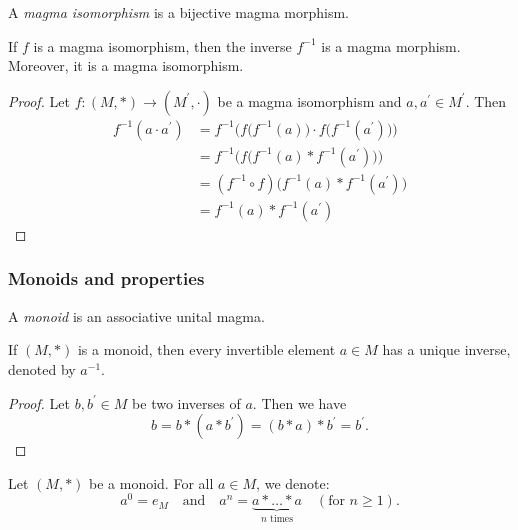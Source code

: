 \documentclass[12pt]{report}
\begin{document}
\begin{definition} \label{def-magma-isomorphism}
    A \emph{magma isomorphism} is a bijective magma morphism.
\end{definition}

\begin{theorem} \label{thm-magma-isomorphism-inverse}
    If $f$ is a magma isomorphism, then the inverse $f^{-1}$ is a magma morphism. Moreover, it is a magma isomorphism.
\end{theorem}

\begin{proof}
    Let $f \colon (M, \ast) \to (M^{\prime}, \cdot)$ be a magma isomorphism and $a, a^{\prime} \in M^{\prime}$. 
    Then
    \[
        \begin{aligned}
            f^{-1}(a \cdot a^{\prime}) 
                &= f^{-1}\Big( f\big( f^{-1}(a) \big) \cdot f\big( f^{-1}(a^{\prime}) \big) \Big) \\
                &= f^{-1}\Big( f\big( f^{-1}(a) \ast f^{-1}(a^{\prime}) \big) \Big) \\
                &= (f^{-1} \circ f) \Big( f^{-1}(a) \ast f^{-1}(a^{\prime}) \Big) \\
                &= f^{-1}(a) \ast f^{-1}(a^{\prime})
        \end{aligned}
    \]
\end{proof}

\subsubsection{Monoids and properties}

\begin{definition} \label{def-monoid}
    A \emph{monoid} is an associative unital magma.
\end{definition}

\begin{theorem} \label{thm-monoid-inverse-uniqueness}
    If $(M, \ast)$ is a monoid, then every invertible element $a \in M$ has a unique inverse, denoted by $a^{-1}$.
\end{theorem}

\begin{proof}
    Let $b, b^{\prime} \in M$ be two inverses of $a$. Then we have
    \[
        b = b \ast (a \ast b^{\prime}) = (b \ast a) \ast b^{\prime} = b^{\prime}.
    \]
\end{proof}

\begin{notation} \label{not-monoid-exponent}
    Let $(M, \ast)$ be a monoid. For all $a \in M$, we denote:
    \[
        a^0 = e_M \quad \text{and} \quad a^n = \underbrace{a \ast \dots \ast a}_{n \text{ times}} \quad (\text{for } n \geq 1).
    \]
\end{notation}
\end{document}
